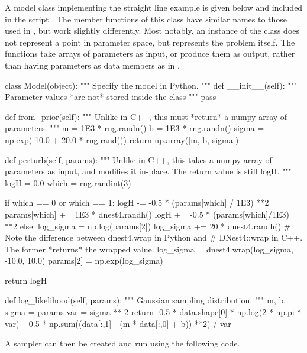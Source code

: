 \documentclass[article]{jss}
\begin{document}
A model class implementing the straight line example is given below
and included in the script .
The member functions of this class have similar names to those
used in , but work slightly differently. Most notably,
an instance of the class does not represent a point in parameter
space, but represents the problem itself. The functions take
 arrays of parameters as input, or produce them as
output, rather than having parameters as data members as in .
%
\begin{CodeChunk}
\begin{CodeInput}
class Model(object):
    """
    Specify the model in Python.
    """
    def __init__(self):
        """
        Parameter values *are not* stored inside the class
        """
        pass

    def from_prior(self):
        """
        Unlike in C++, this must *return* a numpy array of parameters.
        """
        m = 1E3 * rng.randn()
        b = 1E3 * rng.randn()
        sigma = np.exp(-10.0 + 20.0 * rng.rand())
        return np.array([m, b, sigma])

    def perturb(self, params):
        """
        Unlike in C++, this takes a numpy array of parameters as input,
        and modifies it in-place. The return value is still logH.
        """
        logH = 0.0
        which = rng.randint(3)

        if which == 0 or which == 1:
            logH -= -0.5 * (params[which] / 1E3) **2
            params[which] += 1E3 * dnest4.randh()
            logH += -0.5 * (params[which]/1E3) **2
        else:
            log_sigma = np.log(params[2])
            log_sigma += 20 * dnest4.randh()
            # Note the difference between dnest4.wrap in Python and
            # DNest4::wrap in C++. The former *returns* the wrapped value.
            log_sigma = dnest4.wrap(log_sigma, -10.0, 10.0)
            params[2] = np.exp(log_sigma)

        return logH

    def log_likelihood(self, params):
        """
        Gaussian sampling distribution.
        """
        m, b, sigma = params
        var = sigma ** 2
        return -0.5 * data.shape[0] * np.log(2 * np.pi * var)\
                - 0.5 * np.sum((data[:,1] - (m * data[:,0] + b)) **2) / var
\end{CodeInput}
\end{CodeChunk}
%
A sampler can then be created and run using the following code.
\end{document}
